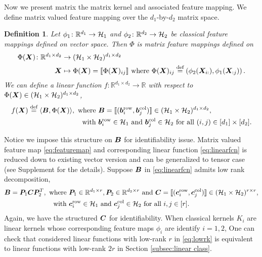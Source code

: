 \documentclass[12pt]{article}
\newtheorem{defn}{Definition}
\begin{document}
Now we present matrix the matrix kernel and associated feature mapping.
We define matrix valued feature mapping over  the $d_1$-by-$d_2$ matrix space.
\begin{defn}\label{def:map}
Let $\phi_1\colon\mathbb{R}^{d_1}\rightarrow \mathcal{H}_1 $ and $\phi_2\colon\mathbb{R}^{d_2}\rightarrow \mathcal{H}_2 $  be classical feature mappings defined on vector space. Then $\Phi$ is matrix feature mappings defined on
\begin{align}\label{eq:featuremap}
    \Phi(\bm X)\colon \mathbb{R}^{d_1\times d_2} &\rightarrow (\mathcal{H}_1\times \mathcal{H}_2)^{d_1\times d_2}\\
    \bm X &\mapsto \Phi(\bm X) = \llbracket \Phi(\bm X)_{ij} \rrbracket\text{ where } \Phi(\bm X)_{ij}\stackrel{\text{def}}{=}\left(\phi_2(\bm X_{i:}),\phi_1(\bm X_{:j})\right).
\end{align}
We can define a linear function  $f\colon \mathbb{R}^{d_1\times d_2}\rightarrow \mathbb{R}$ with respect to $\Phi(\bm X)\in(\mathcal{H}_1\times \mathcal{H}_2)^{d_1\times d_2}$,
\begin{align}\label{eq:linearfcn}
    f(\bm X) \stackrel{\text{def}}{=}\langle \bm B,\Phi(\bm X) \rangle ,\text{ where }& \bm B=\llbracket (\bm{b}^{\text{row}}_i,\bm{b}^{\text{col}}_j) \rrbracket\in(\mathcal{H}_1\times \mathcal{H}_2)^{d_1\times d_2},\\\text{ with }& \bm{b}^{\text{row}}_i\in\mathcal{H}_1\text{ and } \bm{b}^{\text{col}}_j\in\mathcal{H}_2 \text{ for all } (i,j)\in[d_1]\times[d_2].
\end{align}
\end{defn}

Notice we impose this structure on $\bm B$ for identifiability issue.
Matrix valued feature map \eqref{eq:featuremap} and corresponding linear function \eqref{eq:linearfcn} is reduced down to existing vector version  and can be generalized to tensor case (see Supplement for the details).
 Suppose $\bm B$ in \eqref{eq:linearfcn} admits low rank decomposition, 
 \begin{align}\label{eq:lowrk}
     \bm B = \bm{P}_1\bm C\bm{P}_2^T,\text{ where }& \bm{P}_1\in\mathbb{R}^{d_1\times r},\bm{P}_2\in\mathbb{R}^{d_2\times r} \text{ and } \bm C = \llbracket (\bm{c}_i^{\text{row}},\bm{c}_j^{\text{col}}) \rrbracket\in(\mathcal{H}_1\times \mathcal{H}_2)^{r\times r},\\
     \text{ with }&\bm{c}^{\text{row}}_i\in\mathcal{H}_1\text{ and } \bm{c}^{\text{col}}_j\in\mathcal{H}_2 \text{ for all } i,j\in[r].
 \end{align}
 Again, we have the structured $\bm C$ for identifiability. 
   When classical kernels $K_i$  are linear kernels whose corresponding feature maps $\phi_i$ are identify  $i=1,2$, One can check that considered linear functions with low-rank $r$ in \eqref{eq:lowrk} is equivalent to linear functions with low-rank $2r$ in Section \ref{subsec:linear class}.
   
\end{document}

